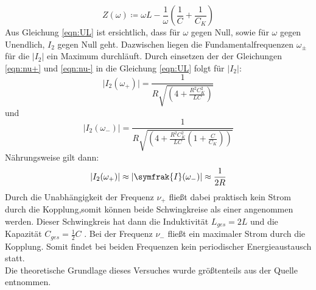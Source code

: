 \begin{equation*}
Z(\omega) \coloneq  \omega L - \frac{1}{\omega}\left(\frac{1}{C} + \frac{1}{C_K} \right)
\end{equation*}
Aus Gleichung \eqref{eqn:UL} ist ersichtlich, dass für $\omega$ gegen Null, sowie für $\omega$ gegen Unendlich, $I_2$ gegen Null geht. Dazwischen liegen die Fundamentalfrequenzen $\omega_{\pm}$ für
die $\lvert I_2 \rvert $ ein Maximum durchläuft. Durch einsetzen der der Gleichungen \eqref{eqn:nu+} und \eqref{eqn:nu-} in die Gleichung \eqref{eqn:UL} folgt für
$\lvert I_2 \rvert $:
\begin{equation}
  \lvert I_2(\omega_+) \rvert = \frac{1}{R \sqrt{\left(4 + \frac{R^2 C_{K}^2}{LC}\right)}}
  \label{eqn:Io+}
\end{equation}
und
\begin{equation}
  \lvert I_2(\omega_-) \rvert = \frac{1}{R \sqrt{\left(4 + \frac{R^2 C_{K}^2}{LC}\left(1+ \frac {C}{C_K}\right)\right)}}
  \label{eqn:Io-}
\end{equation}
Nährungsweise gilt dann:
\begin{equation*}
  \lvert I_2(\omega_+) \rvert \approx \lvert \symfrak{I}(\omega_-) \rvert \approx \frac{1}{2R}
\end{equation*}
Durch die Unabhängigkeit der Frequenz $ \nu_+ $ fließt dabei praktisch kein Strom durch die Kopplung,somit können beide Schwingkreise als einer angenommen werden.
Dieser Schwingkreis hat dann die Induktivität $L_{ges} = 2L $ und die Kapazität $ C_{ges} = \frac{1}{2} C $ . Bei der Frequenz $\nu_-$ fließt ein maximaler Strom
durch die Kopplung. Somit findet bei beiden Frequenzen kein periodischer Energieaustausch statt. \\
Die theoretische Grundlage dieses Versuches wurde größtenteils aus der Quelle \cite{sample} entnommen.
